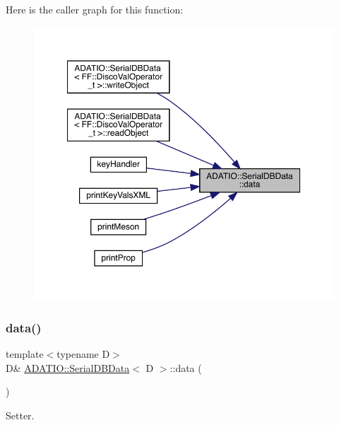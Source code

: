 Here is the caller graph for this function\+:\nopagebreak
\begin{figure}[H]
\begin{center}
\leavevmode
\includegraphics[width=350pt]{d1/d98/classADATIO_1_1SerialDBData_af4a3864baddbecbc6177f164f8a1f664_icgraph}
\end{center}
\end{figure}
\mbox{\label{classADATIO_1_1SerialDBData_af4a3864baddbecbc6177f164f8a1f664}} 
\subsubsection{\texorpdfstring{data()}{data()}\hspace{0.1cm}{\footnotesize\ttfamily [2/4]}}
{\footnotesize\ttfamily template$<$typename D$>$ \\
D\& \mbox{\hyperlink{classADATIO_1_1SerialDBData}{A\+D\+A\+T\+I\+O\+::\+Serial\+D\+B\+Data}}$<$ D $>$\+::data (\begin{DoxyParamCaption}{ }\end{DoxyParamCaption})\hspace{0.3cm}{\ttfamily [inline]}}



Setter. 

\mbox{\label{classADATIO_1_1SerialDBData_a5532be95ec6214348c087afd8b2ff683}} 
